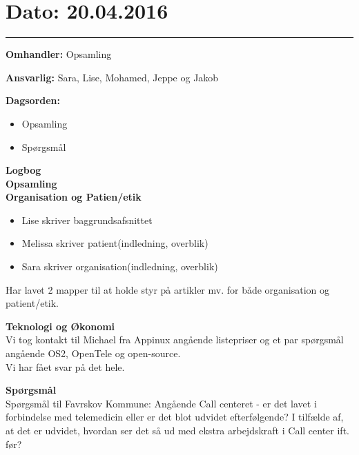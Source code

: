 \section{Dato: 20.04.2016}
\hrule

\textbf{Omhandler:} Opsamling

\textbf{Ansvarlig:} Sara, Lise, Mohamed, Jeppe og Jakob

\textbf{Dagsorden:}
\begin{itemize}
	\item Opsamling
	\item Spørgsmål
\end{itemize}

\textbf{Logbog}
\\

\textbf{Opsamling}
\\
\textbf{Organisation og Patien/etik}
\\
\begin{itemize}
	\item Lise skriver baggrundsafsnittet
	\item Melissa skriver patient(indledning, overblik)
	\item Sara skriver organisation(indledning, overblik)
\end{itemize}
Har lavet 2 mapper til at holde styr på artikler mv. for både organisation og patient/etik.

\textbf{Teknologi og Økonomi}
\\
Vi tog kontakt til Michael fra Appinux angående listepriser og et par spørgsmål angående OS2, OpenTele og open-source.\\
Vi har fået svar på det hele. 

\textbf{Spørgsmål}
\\
Spørgsmål til Favrskov Kommune: Angående Call centeret - er det lavet i forbindelse med telemedicin eller er det blot udvidet efterfølgende? I tilfælde af, at det er udvidet, hvordan ser det så ud med ekstra arbejdskraft i Call center ift. før?